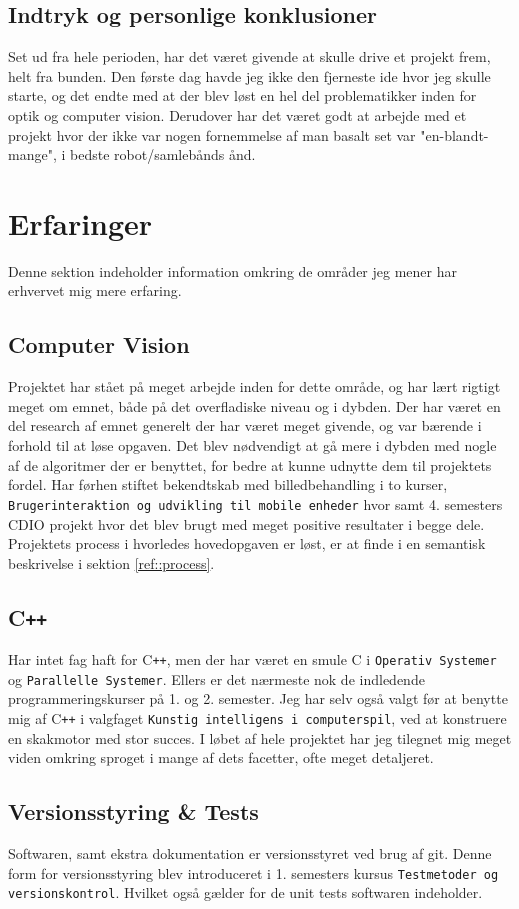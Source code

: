 \subsection{Indtryk og personlige konklusioner}
Set ud fra hele perioden, har det været givende at skulle drive et projekt frem, helt fra bunden. Den første dag havde jeg ikke den fjerneste ide hvor jeg skulle starte, og det endte med at der blev løst en hel del problematikker inden for optik og computer vision.
Derudover har det været godt at arbejde med et projekt hvor der ikke var nogen fornemmelse af man basalt set var "en-blandt-mange", i bedste robot/samlebånds ånd.


\section{Erfaringer}
Denne sektion indeholder information omkring de områder jeg mener har erhvervet mig mere erfaring.

\subsection{Computer Vision}
Projektet har stået på meget arbejde inden for dette område, og har lært rigtigt meget om emnet, både på det overfladiske niveau og i dybden. Der har været en del research af emnet generelt der har været meget givende, og var bærende i forhold til at løse opgaven.
Det blev nødvendigt at gå mere i dybden med nogle af de algoritmer der er benyttet, for bedre at kunne udnytte dem til projektets fordel.
Har førhen stiftet bekendtskab med billedbehandling i to kurser, \texttt{Brugerinteraktion og udvikling til mobile enheder} hvor  samt 4. semesters CDIO projekt hvor det blev brugt med meget positive resultater i begge dele.
Projektets process i hvorledes hovedopgaven er løst, er at finde i en semantisk beskrivelse i sektion \ref{ref::process}.

\subsection{C\texttt{++}}
Har intet fag haft for C\texttt{++}, men der har været en smule C i \texttt{Operativ Systemer} og \texttt{Parallelle Systemer}. Ellers er det nærmeste nok de indledende programmeringskurser på 1. og 2. semester. Jeg har selv også valgt før at benytte mig af C\texttt{++} i valgfaget \texttt{Kunstig intelligens i computerspil}, ved at konstruere en skakmotor med stor succes.
I løbet af hele projektet har jeg tilegnet mig meget viden omkring sproget i mange af dets facetter, ofte meget detaljeret.

\subsection{Versionsstyring \& Tests}
Softwaren, samt ekstra dokumentation er versionsstyret ved brug af git. Denne form for versionsstyring blev introduceret i 1. semesters kursus \texttt{Testmetoder og versionskontrol}. Hvilket også gælder for de unit tests softwaren indeholder.
